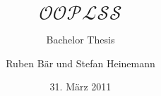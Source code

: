 \documentclass[t,xcolor=svgnames]{beamer}
\title[Object-Oriented Language with Subtyping and Subclassing]{$\mathcal{OOPLSS}$}
\subtitle{Bachelor Thesis}
\institute[BFH-TI]{\textbf{Bern University of Applied Sciences}\\
Engineering and Information Technology}
\author[Ruben Bär und Stefan Heinemann]{Ruben Bär und Stefan Heinemann}
\date{31. März 2011}
\begin{document}
  \mylstset
  
  
  
  
  
  
\end{document}
